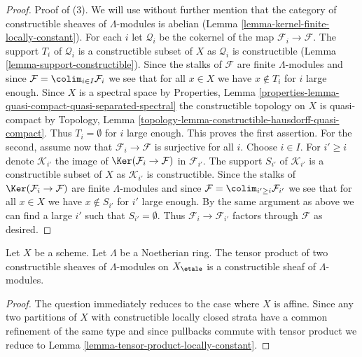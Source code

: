 \begin{proof}
\medskip\noindent
Proof of (3). We will use without further mention that the category of
constructible sheaves of $\Lambda$-modules is abelian
(Lemma \ref{lemma-kernel-finite-locally-constant}).
For each $i$ let $\mathcal{Q}_i$ be the cokernel of the map
$\mathcal{F}_i \to \mathcal{F}$. The support $T_i$ of $\mathcal{Q}_i$
is a constructible subset of $X$ as $\mathcal{Q}_i$ is constructible
(Lemma \ref{lemma-support-constructible}).
Since the stalks of $\mathcal{F}$ are finite $\Lambda$-modules
and since $\mathcal{F} = \colim_{i \in I} \mathcal{F}_i$ we see
that for all $x \in X$ we have $x \not \in T_i$ for $i$ large enough.
Since $X$ is a spectral space by Properties, Lemma
\ref{properties-lemma-quasi-compact-quasi-separated-spectral}
the constructible topology on $X$ is quasi-compact by
Topology, Lemma \ref{topology-lemma-constructible-hausdorff-quasi-compact}.
Thus $T_i = \emptyset$ for $i$ large enough. This proves the first
assertion. For the second, assume now that
$\mathcal{F}_i \to \mathcal{F}$ is surjective for all $i$.
Choose $i \in I$. For $i' \geq i$ denote $\mathcal{K}_{i'}$ the
image of $\Ker(\mathcal{F}_i \to \mathcal{F})$ in $\mathcal{F}_{i'}$.
The support $S_{i'}$ of $\mathcal{K}_{i'}$
is a constructible subset of $X$ as $\mathcal{K}_{i'}$ is constructible.
Since the stalks of $\Ker(\mathcal{F}_i \to \mathcal{F})$
are finite $\Lambda$-modules and since
$\mathcal{F} = \colim_{i' \geq i} \mathcal{F}_{i'}$ we see
that for all $x \in X$ we have $x \not \in S_{i'}$ for $i'$ large enough.
By the same argument as above we can find a large $i'$ such
that $S_{i'} = \emptyset$. Thus $\mathcal{F}_i \to \mathcal{F}_{i'}$
factors through $\mathcal{F}$ as desired.
\end{proof}

\begin{lemma}
\label{lemma-tensor-product-constructible}
Let $X$ be a scheme. Let $\Lambda$ be a Noetherian ring.
The tensor product of two constructible sheaves of $\Lambda$-modules
on $X_\etale$ is a constructible sheaf of $\Lambda$-modules.
\end{lemma}

\begin{proof}
The question immediately reduces to the case where $X$ is affine.
Since any two partitions of $X$ with constructible locally
closed strata have a common refinement of the same type and
since pullbacks commute with tensor product we reduce to
Lemma \ref{lemma-tensor-product-locally-constant}.
\end{proof}

